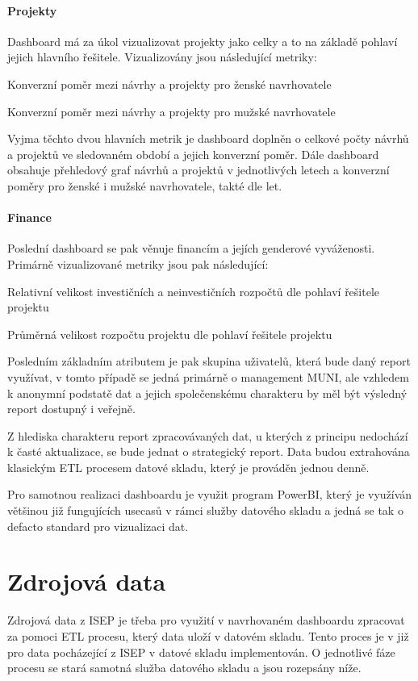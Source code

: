 \documentclass[
  digital,     %
  twoside,     %
  lof,         %
  lot,         %
]{fithesis4}
\begin{document}
\paragraph{Projekty} Dashboard má za úkol vizualizovat projekty jako celky a to na základě pohlaví jejich hlavního řešitele. Vizualizovány jsou následující metriky:
\begin{compactitem}
    \item Konverzní poměr mezi návrhy a projekty pro ženské navrhovatele
    \item Konverzní poměr mezi návrhy a projekty pro mužské navrhovatele
\end{compactitem}
Vyjma těchto dvou hlavních metrik je dashboard doplněn o celkové počty návrhů a projektů ve sledovaném období a jejich konverzní poměr. Dále dashboard obsahuje přehledový graf návrhů a projektů v jednotlivých letech a konverzní poměry pro ženské i mužské navrhovatele, takté dle let.

\paragraph{Finance} Poslední dashboard se pak věnuje financím a jejích genderové vyváženosti. Primárně vizualizované metriky jsou pak následující:
\begin{compactitem}
    \item Relativní velikost investičních a neinvestičních rozpočtů dle pohlaví řešitele projektu
    \item Průměrná velikost rozpočtu projektu dle pohlaví řešitele projektu
\end{compactitem}
\vspace{5}

Posledním základním atributem je pak skupina uživatelů, která bude daný report využívat, v tomto případě se jedná primárně o management MUNI, ale vzhledem k anonymní podstatě dat a jejich společenskému charakteru by měl být výsledný report dostupný i veřejně. 

Z hlediska charakteru report zpracovávaných dat, u kterých z principu nedochází k časté aktualizace, se bude jednat o strategický report. Data budou extrahována klasickým ETL procesem datové skladu, který je prováděn jednou denně. 

Pro samotnou realizaci dashboardu je využit program PowerBI, který je využíván většinou již fungujících usecasů v rámci služby datového skladu a jedná se tak o defacto standard pro vizualizaci dat.

\section{Zdrojová data}
Zdrojová data z ISEP je třeba pro využití v navrhovaném dashboardu zpracovat za pomoci ETL procesu, který data uloží v datovém skladu. Tento proces je v již pro data pocházející z ISEP v datové skladu implementován. O jednotlivé fáze procesu se stará samotná služba datového skladu a jsou rozepsány níže. 
\end{document}
